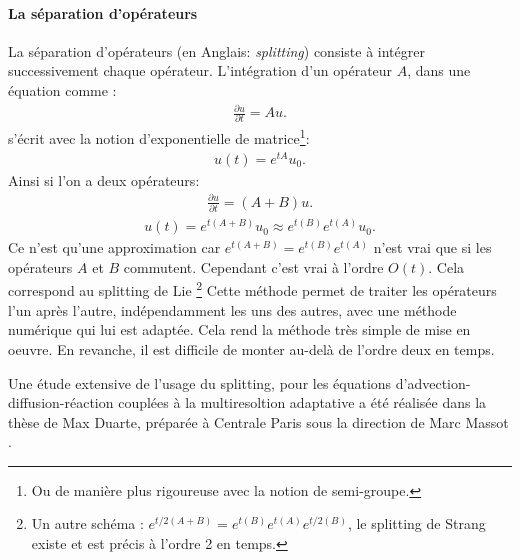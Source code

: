         \paragraph{La séparation d'opérateurs}
            La séparation d'opérateurs (en Anglais: \textit{splitting}) consiste à intégrer successivement chaque opérateur.
            L'intégration d'un opérateur $A$, dans une équation comme :
            \begin{align}\frac{\partial u}{\partial t} = Au.\end{align}
            s'écrit avec la notion d'exponentielle de matrice\footnote{Ou de manière plus rigoureuse avec la notion de semi-groupe.}:
            \begin{align}u(t) = e^{tA}u_0.\end{align}
            Ainsi si l'on a deux opérateurs:
            \begin{align}\frac{\partial u}{\partial t} = (A+B)u.\end{align}
            \begin{align}u(t) = e^{t(A+B)}u_0 \approx e^{t(B)}e^{t(A)}u_0.\end{align}
            Ce n'est qu'une approximation car $e^{t(A+B)} = e^{t(B)}e^{t(A)}$ n'est vrai que si les opérateurs $A$ et $B$ commutent.
            Cependant c'est vrai à l'ordre $O(t)$. Cela correspond au splitting de Lie
            \footnote{Un autre schéma : $e^{t/2(A+B)} = e^{t(B)}e^{t(A)} e^{t/2(B)}$, le splitting de Strang existe et est précis à l'ordre 2 en temps.}
            Cette méthode permet de traiter les opérateurs l'un après l'autre, indépendamment les uns des autres, avec une méthode numérique qui lui est adaptée.
            Cela rend la méthode très simple de mise en oeuvre. En revanche, il est difficile de monter au-delà de l'ordre deux en temps.\par
            Une étude extensive de l'usage du splitting, pour les équations d'advection-diffusion-réaction couplées à la multiresoltion adaptative 
            a été réalisée dans la thèse de Max Duarte, préparée à Centrale Paris sous la direction de Marc Massot \cite{duart2011}.

